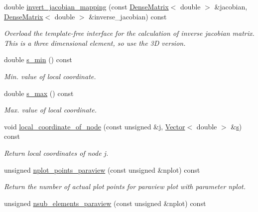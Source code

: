 \begin{DoxyCompactItemize}
double \hyperlink{classoomph_1_1TElement_3_013_00_01NNODE__1D_01_4_ae9abc19e35ca5cc369f8abd3daa87acf}{invert\+\_\+jacobian\+\_\+mapping} (const \hyperlink{classoomph_1_1DenseMatrix}{Dense\+Matrix}$<$ double $>$ \&jacobian, \hyperlink{classoomph_1_1DenseMatrix}{Dense\+Matrix}$<$ double $>$ \&inverse\+\_\+jacobian) const
\begin{DoxyCompactList}\small\item\em Overload the template-\/free interface for the calculation of inverse jacobian matrix. This is a three dimensional element, so use the 3D version. \end{DoxyCompactList}\item 
double \hyperlink{classoomph_1_1TElement_3_013_00_01NNODE__1D_01_4_abeff02fab19ae1db9aa9b127739ee16a}{s\+\_\+min} () const
\begin{DoxyCompactList}\small\item\em Min. value of local coordinate. \end{DoxyCompactList}\item 
double \hyperlink{classoomph_1_1TElement_3_013_00_01NNODE__1D_01_4_a3891a3ac98c4da29b5efd1894b5d4dba}{s\+\_\+max} () const
\begin{DoxyCompactList}\small\item\em Max. value of local coordinate. \end{DoxyCompactList}\item 
void \hyperlink{classoomph_1_1TElement_3_013_00_01NNODE__1D_01_4_ab3aedab732464af390acf1c39eabb782}{local\+\_\+coordinate\+\_\+of\+\_\+node} (const unsigned \&j, \hyperlink{classoomph_1_1Vector}{Vector}$<$ double $>$ \&\hyperlink{cfortran_8h_ab7123126e4885ef647dd9c6e3807a21c}{s}) const
\begin{DoxyCompactList}\small\item\em Return local coordinates of node j. \end{DoxyCompactList}\item 
unsigned \hyperlink{classoomph_1_1TElement_3_013_00_01NNODE__1D_01_4_a72f7a233f0c5c93b8c39fd68e1526d33}{nplot\+\_\+points\+\_\+paraview} (const unsigned \&nplot) const
\begin{DoxyCompactList}\small\item\em Return the number of actual plot points for paraview plot with parameter nplot. \end{DoxyCompactList}\item 
unsigned \hyperlink{classoomph_1_1TElement_3_013_00_01NNODE__1D_01_4_a483175e6ebba087c5c82eebaa0c34218}{nsub\+\_\+elements\+\_\+paraview} (const unsigned \&nplot) const

\end{DoxyCompactItemize}
